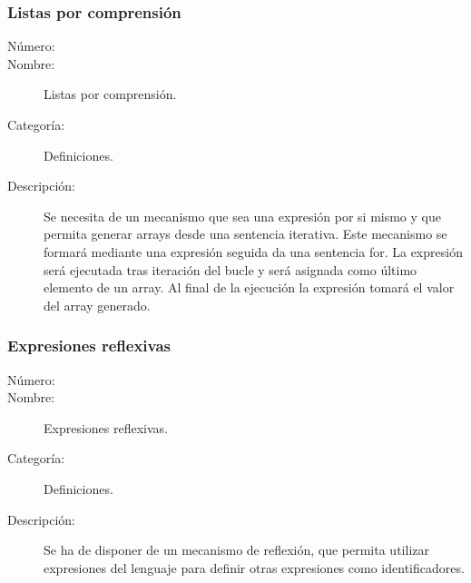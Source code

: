 \subsubsection{Listas por comprensión}
\begin{framed}
	\begin{description}
		\item [Número:] \cn
		\item [Nombre:] Listas por comprensión.
		\item [Categoría:] Definiciones.
		\item [Descripción:] Se necesita de un mecanismo que sea una expresión por si mismo y que permita generar arrays desde una sentencia iterativa. 
		Este mecanismo se formará mediante una expresión seguida da una sentencia for. La expresión será ejecutada tras iteración del bucle y será 
		asignada como último elemento de un array. Al final de la ejecución la expresión tomará el valor del array generado.
	\end{description}
\end{framed}


\subsubsection{Expresiones reflexivas}
\begin{framed}
	\begin{description}
		\item [Número:] \cn
		\item [Nombre:] Expresiones reflexivas.
		\item [Categoría:] Definiciones.
		\item [Descripción:] Se ha de disponer de un mecanismo de reflexión, que permita
utilizar expresiones del lenguaje para definir otras expresiones como identificadores.
	\end{description}
\end{framed}
